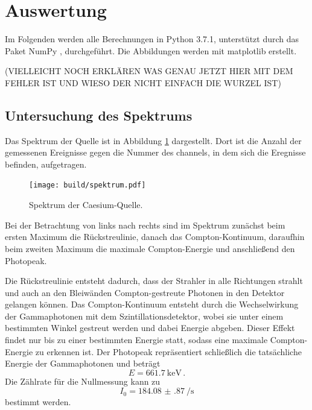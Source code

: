 \section{Auswertung}
\label{sec:Auswertung}

Im Folgenden werden alle Berechnungen in Python 3.7.1, unterstützt durch das
Paket NumPy \cite{numpy}, durchgeführt. Die Abbildungen werden mit matplotlib \cite{matplotlib} erstellt.

(VIELLEICHT NOCH ERKLÄREN WAS GENAU JETZT HIER MIT DEM FEHLER IST UND WIESO DER NICHT EINFACH DIE WURZEL IST)

\subsection{Untersuchung des Spektrums}

Das Spektrum der Quelle ist in Abbildung \ref{fig:spektrum} dargestellt. Dort ist die Anzahl der gemessenen Ereignisse gegen die Nummer des channels, in dem sich die Eregnisse befinden, aufgetragen.

\begin{figure}
  \centering
  \texttt{[image: build/spektrum.pdf]}
  \caption{Spektrum der Caesium-Quelle.}
  \label{fig:spektrum}
\end{figure}

Bei der Betrachtung von links nach rechts sind im Spektrum zunächst beim ersten
Maximum die Rückstreulinie, danach das Compton-Kontinuum, daraufhin beim zweiten
Maximum die maximale Compton-Energie und anschließend den Photopeak.

Die Rückstreulinie entsteht dadurch, dass der Strahler in alle Richtungen strahlt und auch an den Bleiwänden Compton-gestreute Photonen in den Detektor gelangen können. Das Compton-Kontinuum entsteht durch die Wechselwirkung der Gammaphotonen mit dem Szintillationsdetektor, wobei sie unter einem bestimmten Winkel gestreut werden und dabei Energie abgeben. Dieser Effekt findet nur bis zu einer bestimmten Energie statt, sodass eine maximale Compton-Energie zu erkennen ist.
Der Photopeak repräsentiert schließlich die tatsächliche Energie der Gammaphotonen
und beträgt
\begin{equation*}
  E=\SI{661.7}{\kilo\eV} \,.
\end{equation*}
Die Zählrate für die Nullmessung kann zu
\begin{equation*}
  I_0=\SI{184.08(87)}{\per \second}
\end{equation*}
bestimmt werden.

